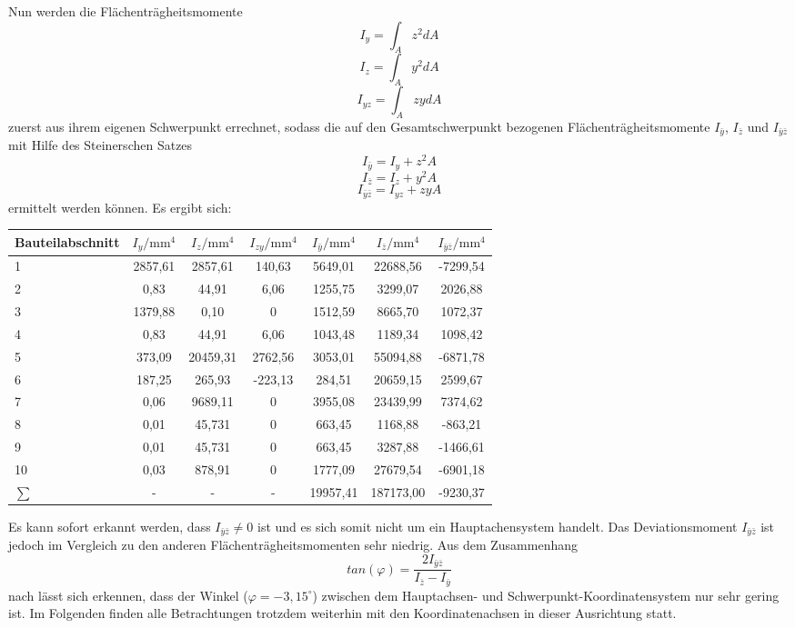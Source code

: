 \noindent Nun werden die Flächenträgheitsmomente 
\begin{equation}\label{FT1}
	I_{y} = \int_{A}^{}z^2dA
\end{equation}
\begin{equation}
I_{z} = \int_{A}^{}y^2dA
\end{equation}
\begin{equation}\label{FT3}
I_{yz} = \int_{A}^{}zydA
\end{equation}
 zuerst aus ihrem eigenen Schwerpunkt errechnet, sodass die auf den Gesamtschwerpunkt bezogenen Flächenträgheitsmomente $I_{\bar{y}}$, $I_{\bar{z}}$ und $I_{\bar{y}\bar{z}}$ mit Hilfe des Steinerschen Satzes
 \begin{equation}
 	I_{\bar{y}} = I_{y} + z^2A
 \end{equation}
\begin{equation}
I_{\bar{z}} = I_{z} + y^2A
\end{equation}
\begin{equation}
I_{\bar{y}\bar{z}} = I_{yz} + zyA
\end{equation}
 ermittelt werden können.
Es ergibt sich:
\begin{center}

\begin{tabular}[h]{l|c|c|c||c|c|c}
Bauteilabschnitt&$I_{y}/\mathrm{mm}^4$&$I_{z}/\mathrm{mm}^4$&$I_{zy}/\mathrm{mm}^4$&$I_{\bar{y}}/\mathrm{mm}^4$&$I_{\bar{z}}/\mathrm{mm}^4$&$I_{\bar{y}\bar{z}}/\mathrm{mm}^4$\\
\hline
1&2857,61&2857,61&140,63&5649,01&22688,56&-7299,54\\
2&0,83&44,91&6,06&1255,75&3299,07&2026,88\\
3&1379,88&0,10&0&1512,59&8665,70&1072,37\\
4&0,83&44,91&6,06&1043,48&1189,34&1098,42\\
5&373,09&20459,31&2762,56&3053,01&55094,88&-6871,78\\
6&187,25&265,93&-223,13&284,51&20659,15&2599,67\\
7&0,06&9689,11&0&3955,08&23439,99&7374,62\\
8&0,01&45,731&0&663,45&1168,88&-863,21\\
9&0,01&45,731&0&663,45&3287,88&-1466,61\\
10&0,03&878,91&0&1777,09&27679,54&-6901,18\\
\hline
$\sum{}$&-&-&-&19957,41&187173,00&-9230,37
\end{tabular}
\end{center}
Es kann sofort erkannt werden, dass $I_{\bar{y}\bar{z}} \neq 0$ ist und es sich somit nicht um ein Hauptachensystem handelt. Das Deviationsmoment  $I_{\bar{y}\bar{z}}$ ist jedoch im Vergleich zu den anderen Flächenträgheitsmomenten sehr niedrig. 
Aus dem Zusammenhang
\begin{equation}
	tan(\varphi)=\frac{2I_{\bar{y}\bar{z}}}{I_{\bar{z}}-I_{\bar{y}}}
\end{equation}
nach \cite{item15} lässt sich erkennen, dass der Winkel ($\varphi =-3,15^\circ$) zwischen dem Hauptachsen- und Schwerpunkt-Koordinatensystem nur sehr gering ist. Im Folgenden finden alle Betrachtungen trotzdem weiterhin mit den Koordinatenachsen in dieser Ausrichtung statt.

